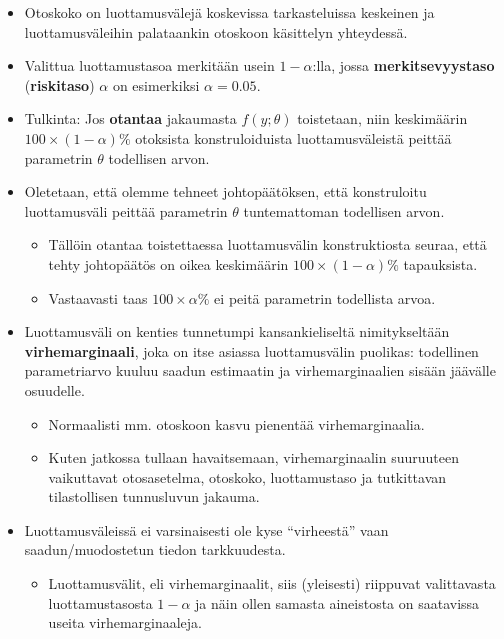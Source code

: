 \documentclass[
]{book}
\providecommand{\tightlist}{%
  \setlength{\itemsep}{0pt}\setlength{\parskip}{0pt}}
\begin{document}
\begin{itemize}
\item
  Otoskoko on luottamusvälejä koskevissa tarkasteluissa keskeinen ja luottamusväleihin palataankin otoskoon käsittelyn yhteydessä.
\item
  Valittua luottamustasoa merkitään usein \(1-\alpha\):lla, jossa \textbf{merkitsevyystaso} (\textbf{riskitaso}) \(\alpha\) on esimerkiksi \(\alpha=0.05\).
\item
  Tulkinta: Jos \textbf{otantaa} jakaumasta \(f(y;\theta)\) toistetaan, niin keskimäärin \(100 \times (1-\alpha)\%\) otoksista konstruloiduista luottamusväleistä peittää parametrin \(\theta\) todellisen arvon.
\item
  Oletetaan, että olemme tehneet johtopäätöksen, että konstruloitu luottamusväli peittää parametrin \(\theta\) tuntemattoman todellisen arvon.

  \begin{itemize}
  \tightlist
  \item
    Tällöin otantaa toistettaessa luottamusvälin konstruktiosta seuraa, että tehty johtopäätös on oikea keskimäärin \(100 \times (1-\alpha)\%\) tapauksista.
  \item
    Vastaavasti taas \(100 \times \alpha \%\) ei peitä parametrin todellista arvoa.
  \end{itemize}
\item
  Luottamusväli on kenties tunnetumpi kansankieliseltä nimitykseltään \textbf{virhemarginaali}, joka on itse asiassa luottamusvälin puolikas: todellinen parametriarvo kuuluu saadun estimaatin ja virhemarginaalien sisään jäävälle osuudelle.

  \begin{itemize}
  \tightlist
  \item
    Normaalisti mm. otoskoon kasvu pienentää virhemarginaalia.
  \item
    Kuten jatkossa tullaan havaitsemaan, virhemarginaalin suuruuteen vaikuttavat otosasetelma, otoskoko, luottamustaso ja tutkittavan tilastollisen tunnusluvun jakauma.
  \end{itemize}
\item
  Luottamusväleissä ei varsinaisesti ole kyse ``virheestä'' vaan saadun/muodostetun tiedon tarkkuudesta.

  \begin{itemize}
  \tightlist
  \item
    Luottamusvälit, eli virhemarginaalit, siis (yleisesti) riippuvat valittavasta luottamustasosta \(1-\alpha\) ja näin ollen samasta aineistosta on saatavissa useita virhemarginaaleja.


\end{itemize}
\end{itemize}
\end{document}
